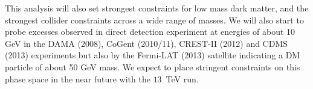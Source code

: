 This analysis will also set strongest constraints for low mass dark matter, and the strongest collider constraints across a wide range of masses. We will also start to probe excesses observed in direct detection experiment at energies of about 10 GeV in the DAMA (2008), CoGent (2010/11), CREST-II (2012) and CDMS (2013) experiments but also by the Fermi-LAT (2013) satellite indicating a DM particle of about 50 GeV mass. We expect to place stringent constraints on this phase space in the near future with the $13$~TeV run.

